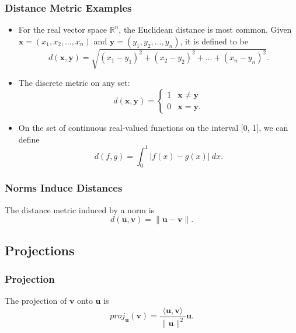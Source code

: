 \documentclass{beamer}
\begin{document}
\begin{frame}
\frametitle{Distance Metric Examples}

\begin{itemize}
\item For the real vector space $\mathbb{R}^n$, the Euclidean distance is most common. Given ${\boldsymbol x} = \left(x_1, x_2, \ldots, x_n\right)$ and ${\boldsymbol y} = (y_1, y_2, \ldots, y_n)$, it is defined to be
$$
d({\boldsymbol x}, {\boldsymbol y})= \sqrt{(x_1 - y_1)^2 + (x_2 - y_2)^2 +\ldots + (x_n -y_n)^2}.
$$
\item The discrete metric on any set:
$$
d({\boldsymbol x}, {\boldsymbol y}) = \begin{cases} 1	&	{\boldsymbol x} \neq {\boldsymbol y} \\ 0	&	{\boldsymbol x} = {\boldsymbol y}.\end{cases}
$$
\item On the set of continuous real-valued functions on the interval [0, 1], we can define
$$
d(f, g) = \int_0^1 \left| f(x) - g(x)\right|\ dx.
$$
\end{itemize}

\end{frame}

\begin{frame}
\frametitle{Norms Induce Distances}
The distance metric induced by a norm is
$$
d({\boldsymbol u}, {\boldsymbol v}) = \| {\boldsymbol u} - {\boldsymbol v}\|.
$$
\end{frame}

\subsection{Projections}

\begin{frame}[t]
\frametitle{Projection}
The projection of ${\boldsymbol v}$ onto ${\boldsymbol u}$ is
$$
proj_{\boldsymbol u}({\boldsymbol v}) = \frac{\langle {\boldsymbol u}, {\boldsymbol v} \rangle}{\| {\boldsymbol u}\|^2} {\boldsymbol u}.
$$
\begin{figure}
\centering
{}
\end{figure}
\end{frame}
\end{document}
